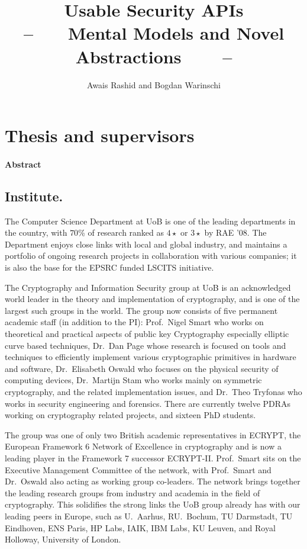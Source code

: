 \documentclass[10pt]{article}
\date{}
\title{\bf Usable Security APIs\\
-- \ \ \ {\large Mental Models and Novel Abstractions \ \ \ } --}
\author{Awais Rashid and Bogdan Warinschi}
\begin{document}
\maketitle
\section{Thesis and supervisors}


\paragraph*{Abstract}


\iffalse
\subsection*{Institute.}
The Computer Science Department at UoB is one of
the leading departments in the country, with $70$\% of research ranked as
$4\star$ or $3\star$ by RAE '08.
The Department enjoys close links with local and global industry, and maintains
a portfolio of ongoing research projects in collaboration with various
companies; it is also the base for the EPSRC funded LSCITS initiative.

The Cryptography and Information Security group at UoB is an acknowledged
world leader in the theory and implementation of cryptography, and is
one of the largest such groups in the world.
The group now consists of five permanent academic staff (in
addition to the PI): 
Prof.~Nigel Smart who works on theoretical and practical aspects of public key 
Cryptography especially elliptic curve based techniques, 
Dr.~Dan Page whose research is focused on tools and techniques to efficiently 
implement various cryptographic primitives in hardware and software, 
Dr.~Elisabeth Oswald who focuses on the physical security of computing devices, 
Dr.~Martijn Stam who works mainly on symmetric cryptography,  
and the related implementation issues, and 
Dr.~Theo Tryfonas who works in security engineering and forensics.
There are currently twelve PDRAs working on cryptography related projects, 
and sixteen PhD students.



The group was one of only two British academic representatives in ECRYPT, 
the European Framework 6 Network of Excellence in cryptography and is now a leading player in the Framework 7 successor  ECRYPT-II. 
Prof.~Smart sits on the Executive Management Committee of the network,
with Prof.~Smart and Dr.~Oswald also acting as working group co-leaders.
The network brings together the leading research groups from industry
and academia in the field of cryptography.
This solidifies the strong links the UoB group already has with our
leading peers in Europe, such as U.~Aarhus, RU.~Bochum, TU Darmstadt, TU Eindhoven, 
ENS Paris, HP Labs, IAIK, IBM Labs, KU Leuven, and Royal Holloway, University of London.
\end{document}
